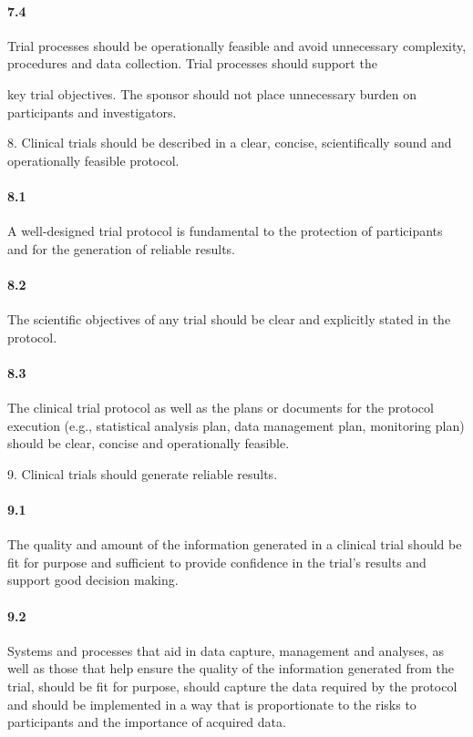 \documentclass[11pt]{article}
\begin{document}
\paragraph{7.4} Trial processes should be operationally feasible and avoid unnecessary complexity, procedures and data collection. Trial processes should support the

key trial objectives. The sponsor should not place unnecessary burden on participants and investigators.


8. Clinical trials should be described in a clear, concise, scientifically sound and operationally feasible protocol.


\paragraph{8.1} A well-designed trial protocol is fundamental to the protection of participants and for the generation of reliable results.

\paragraph{8.2} The scientific objectives of any trial should be clear and explicitly stated in the protocol.

\paragraph{8.3} The clinical trial protocol as well as the plans or documents for the protocol execution (e.g., statistical analysis plan, data management plan, monitoring plan) should be clear, concise and operationally feasible.

9. Clinical trials should generate reliable results.


\paragraph{9.1} The quality and amount of the information generated in a clinical trial should be fit for purpose and sufficient to provide confidence in the trial's results and support good decision making.

\paragraph{9.2} Systems and processes that aid in data capture, management and analyses, as well as those that help ensure the quality of the information generated from the trial, should be fit for purpose, should capture the data required by the protocol and should be implemented in a way that is proportionate to the risks to participants and the importance of acquired data.
\end{document}
